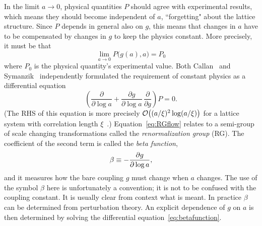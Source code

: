In the limit $a\to0$, physical quantities $P$ should agree with experimental
results, which means they should become independent of $a$, ``forgetting"
about the lattice structure. Since $P$ depends in general also on $g$,
this means that changes in $a$ have to be compensated by changes in $g$
to keep the physics constant. More precisely, it must be that 
\begin{equation}
  \lim_{a\to0}P\Big(g(a),a\Big)=P_0
\end{equation}
where $P_0$ is the physical quantity's experimental value.
Both Callan~\cite{callan_broken_1970} and
Symanzik~\cite{symanzik_small_1970,symanzik_small-distance-behaviour_1971}
independently formulated the requirement of constant physics as
a differential equation
\begin{equation}\label{eq:RGflow}
  \left(\frac{\partial}{\partial\log a}
        +\frac{\partial g}{\partial\log a}
         \,\frac{\partial}{\partial g}\right)P=0. 
\end{equation}
(The RHS of this equation is more precisely
$\order{(a/\xi)^2\log(a/\xi)}$ for a lattice system
with correlation length $\xi$~\cite{montvay_quantum_1994}.)
Equation~\eqref{eq:RGflow} relates to a semi-group of scale 
changing transformations called the {\it renormalization group} (RG). 
The coefficient of the second term is called the {\it beta function},
\begin{equation}\label{eq:betafunction}\index{beta function}
  \beta\equiv-\frac{\partial g}{\partial\log a},
\end{equation}
and it measures how the bare coupling $g$ must change when $a$ changes.
The use of the symbol $\beta$ here is unfortunately a convention; it
is not to be confused with the coupling constant. It is usually clear
from context what is meant. In practice $\beta$ can be determined
from perturbation theory. An explicit dependence of $g$ on $a$ is then
determined by solving the differential equation~\eqref{eq:betafunction}. 

